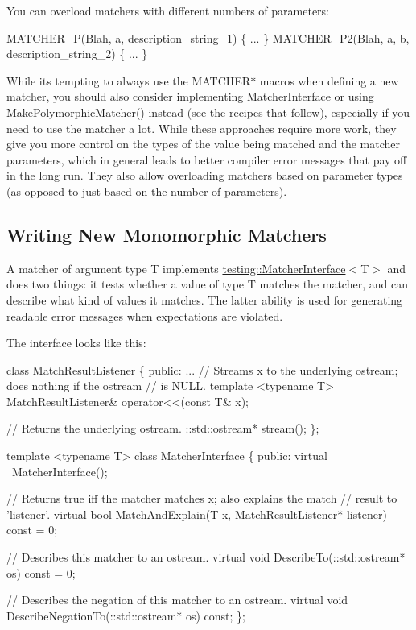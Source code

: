 You can overload matchers with different numbers of parameters\+: 
\begin{DoxyCode}
MATCHER\_P(Blah, a, description\_string\_1) \{ ... \}
MATCHER\_P2(Blah, a, b, description\_string\_2) \{ ... \}
\end{DoxyCode}


While it\textquotesingle{}s tempting to always use the {\ttfamily M\+A\+T\+C\+H\+E\+R$\ast$} macros when defining a new matcher, you should also consider implementing {\ttfamily Matcher\+Interface} or using {\ttfamily \hyperlink{namespacetesting_a667ca94f190ec2e17ee2fbfdb7d3da04}{Make\+Polymorphic\+Matcher()}} instead (see the recipes that follow), especially if you need to use the matcher a lot. While these approaches require more work, they give you more control on the types of the value being matched and the matcher parameters, which in general leads to better compiler error messages that pay off in the long run. They also allow overloading matchers based on parameter types (as opposed to just based on the number of parameters).

\subsection*{Writing New Monomorphic Matchers}

A matcher of argument type {\ttfamily T} implements {\ttfamily \hyperlink{classtesting_1_1MatcherInterface}{testing\+::\+Matcher\+Interface}$<$T$>$} and does two things\+: it tests whether a value of type {\ttfamily T} matches the matcher, and can describe what kind of values it matches. The latter ability is used for generating readable error messages when expectations are violated.

The interface looks like this\+:


\begin{DoxyCode}
class MatchResultListener \{
 public:
  ...
  // Streams x to the underlying ostream; does nothing if the ostream
  // is NULL.
  template <typename T>
  MatchResultListener& operator<<(const T& x);

  // Returns the underlying ostream.
  ::std::ostream* stream();
\};

template <typename T>
class MatcherInterface \{
 public:
  virtual ~MatcherInterface();

  // Returns true iff the matcher matches x; also explains the match
  // result to 'listener'.
  virtual bool MatchAndExplain(T x, MatchResultListener* listener) const = 0;

  // Describes this matcher to an ostream.
  virtual void DescribeTo(::std::ostream* os) const = 0;

  // Describes the negation of this matcher to an ostream.
  virtual void DescribeNegationTo(::std::ostream* os) const;
\};
\end{DoxyCode}


